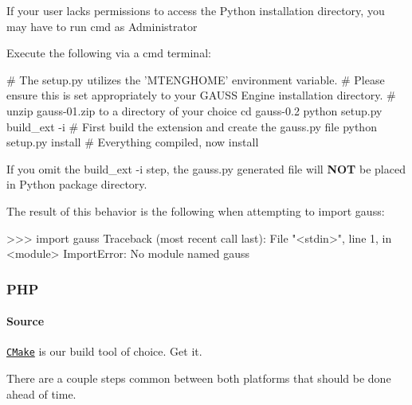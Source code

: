 If your user lacks permissions to access the Python installation directory, you may have to run {\ttfamily cmd} as Administrator

Execute the following via a {\ttfamily cmd} terminal\-:


\begin{DoxyCode}
\textcolor{preprocessor}{# The setup.py utilizes the 'MTENGHOME' environment variable.}
\textcolor{preprocessor}{}\textcolor{preprocessor}{# Please ensure this is set appropriately to your GAUSS Engine installation directory.}
\textcolor{preprocessor}{}\textcolor{preprocessor}{# unzip gauss-01.zip to a directory of your choice}
\textcolor{preprocessor}{}cd gauss-0.2
python setup.py build\_ext -i      # First build the extension and create the gauss.py file
python setup.py install           # Everything compiled, now install
\end{DoxyCode}


If you omit the {\ttfamily build\-\_\-ext -\/i} step, the {\ttfamily gauss.\-py} generated file will {\bfseries N\-O\-T} be placed in Python package directory.

The result of this behavior is the following when attempting to {\ttfamily import gauss}\-: \begin{DoxyVerb}>>> import gauss
Traceback (most recent call last):
  File "<stdin>", line 1, in <module>
ImportError: No module named gauss
\end{DoxyVerb}


\subsubsection*{P\-H\-P}

\paragraph*{Source}

\href{http://www.cmake.org}{\tt C\-Make} is our build tool of choice. Get it.

There are a couple steps common between both platforms that should be done ahead of time.


